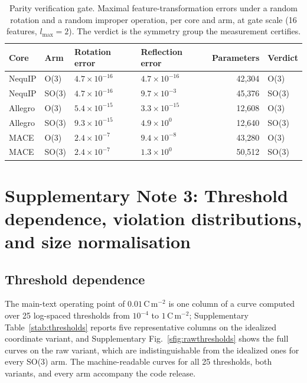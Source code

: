 \begin{table}[htbp]
\centering
\small
\caption{Parity verification gate. Maximal feature-transformation errors under a random rotation and a random improper operation, per core and arm, at gate scale (16 features, $l_{\max}=2$). The verdict is the symmetry group the measurement certifies.}
\label{stab:gate}
\begin{tabular}{llllrl}
\toprule
Core & Arm & Rotation error & Reflection error & Parameters & Verdict \\
\midrule
NequIP & O(3) & $4.7\times10^{-16}$ & $4.7\times10^{-16}$ & 42{,}304 & O(3) \\
NequIP & SO(3) & $4.7\times10^{-16}$ & $9.7\times10^{-3}$ & 45{,}376 & SO(3) \\
Allegro & O(3) & $5.4\times10^{-15}$ & $3.3\times10^{-15}$ & 12{,}608 & O(3) \\
Allegro & SO(3) & $9.3\times10^{-15}$ & $4.9\times10^{0}$ & 12{,}640 & SO(3) \\
MACE & O(3) & $2.4\times10^{-7}$ & $9.4\times10^{-8}$ & 43{,}280 & O(3) \\
MACE & SO(3) & $2.4\times10^{-7}$ & $1.3\times10^{0}$ & 50{,}512 & SO(3) \\
\bottomrule
\end{tabular}
\end{table}

\section*{Supplementary Note 3: Threshold dependence, violation distributions, and size normalisation}

\subsection*{Threshold dependence}

The main-text operating point of $0.01$\,C\,m$^{-2}$ is one column of a curve computed over 25 log-spaced thresholds from $10^{-4}$ to $1$\,C\,m$^{-2}$; Supplementary Table~\ref{stab:thresholds} reports five representative columns on the idealized coordinate variant, and Supplementary Fig.~\ref{sfig:rawthresholds} shows the full curves on the raw variant, which are indistinguishable from the idealized ones for every SO(3) arm. The machine-readable curves for all 25 thresholds, both variants, and every arm accompany the code release.

